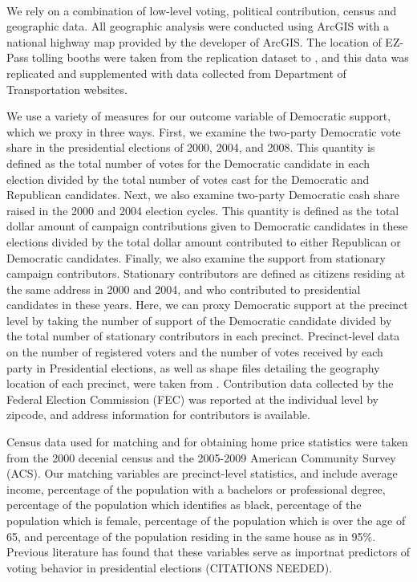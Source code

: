 \\ 
\indent We rely on a combination of low-level voting, political contribution, census and geographic data. All geographic analysis were conducted using ArcGIS with a national highway map provided by the developer of ArcGIS. The location of EZ-Pass tolling booths were taken from the replication dataset to \textcite{Currie2011a}, and this data was replicated and supplemented with data collected from Department of Transportation websites. 

We use a variety of measures for our outcome variable of Democratic support, which we proxy in three ways. First, we examine the two-party Democratic vote share in the presidential elections of 2000, 2004, and 2008. This quantity is defined as the total number of votes for the Democratic candidate in each election divided by the total number of votes cast for the Democratic and Republican candidates. Next, we also examine two-party Democratic cash share raised in the 2000 and 2004 election cycles. This quantity is defined as the total dollar amount of campaign contributions given to Democratic candidates in these elections divided by the total dollar amount contributed to either Republican or Democratic candidates. Finally, we also examine the support from stationary campaign contributors. Stationary contributors are defined as citizens residing at the same address in 2000 and 2004, and who contributed to presidential candidates in these years. Here, we can proxy Democratic support at the precinct level by taking the number of support of the Democratic candidate divided by the total number of stationary contributors in each precinct. Precinct-level data on the number of registered voters and the number of votes received by each party in Presidential elections, as well as shape files detailing the geography location of each precinct, were taken from \textcite{Ansolabehere2014}. Contribution data collected by the Federal Election Commission (FEC) was reported at the individual level by zipcode, and address information for contributors is available. 

Census data used for matching and for obtaining home price statistics were taken from the 2000 decenial census and the 2005-2009 American Community Survey (ACS). Our matching variables are precinct-level statistics, and include average income, percentage of the population with a bachelors or professional degree, percentage of the population which identifies as black, percentage of the population which is female, percentage of the population which is over the age of 65, and percentage of the population residing in the same house as in 95\%. Previous literature has found that these variables serve as importnat predictors of voting behavior in presidential elections (CITATIONS NEEDED). 


